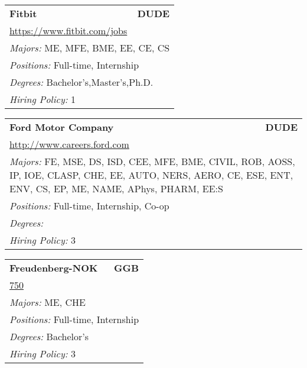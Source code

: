 \documentclass[twoside]{article}
\begin{document}
\begin{center}
\begin{multicols}{3}
\begin{FlushLeft}
\begin{minipage}{\columnwidth}
\end{minipage}
 
\begin{minipage}{\columnwidth}\begin{tabularx}{.95\columnwidth}{Xr}
                 {\Large\bf Fitbit} & {\Large\bf DUDE}\\
    \multicolumn{2}{p{.95\columnwidth}}{\url{https://www.fitbit.com/jobs}}\\
    \multicolumn{2}{p{.95\columnwidth}}{\emph{Majors:} ME, MFE, BME, EE, CE, CS}\\
    \multicolumn{2}{p{.95\columnwidth}}{\emph{Positions:} Full-time, Internship}\\
    \multicolumn{2}{p{.95\columnwidth}}{\emph{Degrees:} Bachelor's,Master's,Ph.D.}\\
    \multicolumn{2}{p{.95\columnwidth}}{\emph{Hiring Policy:} 1}\\
    \end{tabularx}
    
\end{minipage}
 
\begin{minipage}{\columnwidth}\begin{tabularx}{.95\columnwidth}{Xr}
                 {\Large\bf Ford Motor Company} & {\Large\bf DUDE}\\
    \multicolumn{2}{p{.95\columnwidth}}{\url{http://www.careers.ford.com}}\\
    \multicolumn{2}{p{.95\columnwidth}}{\emph{Majors:} FE, MSE, DS, ISD, CEE, MFE, BME, CIVIL, ROB, AOSS, IP, IOE, CLASP, CHE, EE, AUTO, NERS, AERO, CE, ESE, ENT, ENV, CS, EP, ME, NAME, APhys, PHARM, EE:S}\\
    \multicolumn{2}{p{.95\columnwidth}}{\emph{Positions:} Full-time, Internship, Co-op}\\
    \multicolumn{2}{p{.95\columnwidth}}{\emph{Degrees:} }\\
    \multicolumn{2}{p{.95\columnwidth}}{\emph{Hiring Policy:} 3}\\
    \end{tabularx}
    
\end{minipage}
 
\begin{minipage}{\columnwidth}\begin{tabularx}{.95\columnwidth}{Xr}
                 {\Large\bf Freudenberg-NOK} & {\Large\bf GGB}\\
    \multicolumn{2}{p{.95\columnwidth}}{\url{750}}\\
    \multicolumn{2}{p{.95\columnwidth}}{\emph{Majors:} ME, CHE}\\
    \multicolumn{2}{p{.95\columnwidth}}{\emph{Positions:} Full-time, Internship}\\
    \multicolumn{2}{p{.95\columnwidth}}{\emph{Degrees:} Bachelor's}\\
    \multicolumn{2}{p{.95\columnwidth}}{\emph{Hiring Policy:} 3}\\
    \end{tabularx}
    

\end{minipage}
\end{FlushLeft}
\end{multicols}
\end{center}
\end{document}
